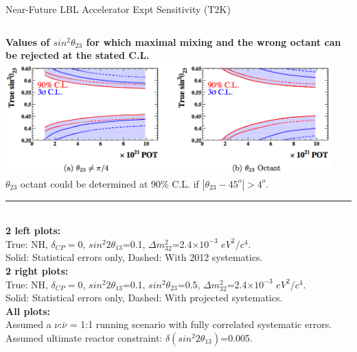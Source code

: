


\begin{frame}{Near-Future LBL Accelerator Expt Sensitivity (T2K)}

\begin{columns}[T]
  \begin{column}{0.66\textwidth}
    \begin{center}
      {\bf \scriptsize
         Values of $sin^{2}{\theta}_{23}$ for which maximal mixing and the wrong octant
         can be rejected at the stated C.L.\\
      }
      \vspace{0.1cm}
      \includegraphics[width=0.94\textwidth]{./images/3nu/accelerator/future_sensitivity/t2k/max23mix_octant_resulution.png}\\
      {\scriptsize
         $\theta_{23}$ octant could be determined at 90\% C.L. if $|\theta_{23}-45^{o}| > 4^{o}$.
      }
    \end{center}
    \noindent\rule{2cm}{0.4pt}\\
    {\tiny
      {\bf 2 left plots:}\\
      True: NH, ${\delta}_{CP}=0$, $sin^{2}2{\theta}_{13}$=0.1, ${\Delta}m^{2}_{32}$=2.4$\times10^{-3}$ $eV^{2}/c^{4}$.\\
      Solid: Statistical errors only, Dashed: With 2012 systematics.\\
      \vspace{0.1cm}
      {\bf 2 right plots:}\\
      True: NH, ${\delta}_{CP}=0$, $sin^{2}2{\theta}_{13}$=0.1, $sin^{2}{\theta}_{23}$=0.5, ${\Delta}m^{2}_{32}$=2.4$\times10^{-3}$ $eV^{2}/c^{4}$.\\
      Solid: Statistical errors only, Dashed: With projected systematics.\\
      \vspace{0.1cm}
      {\bf All plots:}\\
      Assumed a $\nu$:$\bar{\nu}$ = 1:1 running scenario
      with fully correlated systematic errors.\\
      Assumed ultimate reactor constraint: $\delta(sin^{2}2{\theta}_{13})$=0.005.\\
}
\end{column}
\end{columns}
\end{frame}
